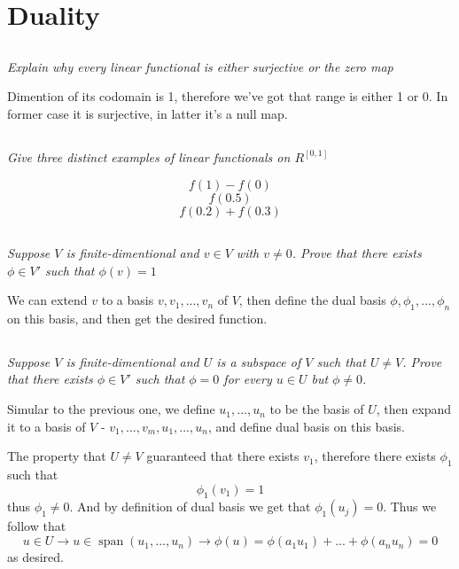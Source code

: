 \documentclass[11pt,oneside,titlepage]{book}
\DeclareMathOperator \Span {span}
\begin{document}
\section{Duality}

\subsection{}

\textit{Explain why every linear functional is either surjective or the zero map}

Dimention of its codomain is 1, therefore we've got that range is either 1 or 0. In former
case it is surjective, in latter it's a null map.

\subsection{}

\textit{Give three distinct examples of linear functionals on $R^{[0, 1]}$}

$$f(1) - f(0)$$
$$f(0.5)$$
$$f(0.2) + f(0.3)$$

\subsection{}

\textit{Suppose $V$ is finite-dimentional and $v \in V$ with $v \neq 0$. Prove that there exists
  $\phi \in V'$ such that $\phi(v) = 1$}

We can extend $v$ to a basis $v, v_1, ..., v_n$ of $V$, then define the dual basis
$\phi, \phi_1, ..., \phi_n$ on this basis, and then get the desired function.

\subsection{}

\textit{Suppose $V$ is finite-dimentional and $U$ is a subspace of $V$ such that $U \neq V$. Prove
  that there exists $\phi \in V'$ such that $\phi = 0$ for every $u \in U$ but $\phi \neq 0$.}

Simular to the previous one, we define $u_1, ..., u_n$ to be the basis of $U$, then expand it
to a basis of $V$ - $v_1, ..., v_m, u_1, ..., u_n$, and define dual basis on this basis.

The property that $U \neq V$ guaranteed that there exists $v_1$, therefore
there exists $\phi_1$ such that
$$\phi_1(v_1 ) = 1$$
thus $\phi_1 \neq 0$. And by definition of dual basis we get that $\phi_1 (u_j) = 0$.
Thus we follow that
$$u \in U \to u \in \Span(u_1, ..., u_n) \to \phi(u) = \phi(a_1 u_1) + ... + \phi(a_n u_n) = 0$$
as desired.
\end{document}
